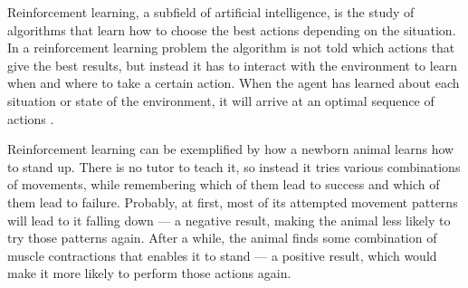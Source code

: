 Reinforcement learning, a subfield of artificial intelligence, is the study of algorithms that learn how to choose the best actions depending on the situation. In a reinforcement learning problem the algorithm is not told which actions that give the best results, but instead it has to interact with the environment to learn when and where to take a certain action. When the agent has learned about each situation or state of the environment, it will arrive at an optimal sequence of actions \parencite{barto1998reinforcement}.




Reinforcement learning can be exemplified by how a newborn animal learns how to stand up. There is no tutor to teach it, so instead it tries various combinations of movements, while remembering which of them lead to success and which of them lead to failure. Probably, at first, most of its attempted movement patterns will lead to it falling down --- a negative result, making the animal less likely to try those patterns again. After a while, the animal finds some combination of muscle contractions that enables it to stand --- a positive result, which would make it more likely to perform those actions again. 

